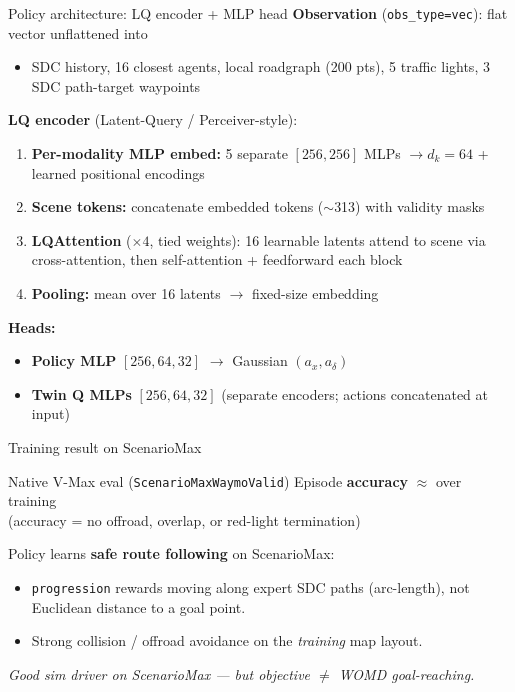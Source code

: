 \begin{frame}{Policy architecture: LQ encoder + MLP head}
  \textbf{Observation} (\texttt{obs\_type=vec}): flat vector unflattened into
  \begin{itemize}
    \item SDC history, 16 closest agents, local roadgraph (200 pts),
          5 traffic lights, 3 SDC path-target waypoints
  \end{itemize}

  \vspace{0.4em}
  \textbf{LQ encoder} (Latent-Query / Perceiver-style):
  \begin{enumerate}
    \item \textbf{Per-modality MLP embed:} 5 separate $[256,256]$ MLPs $\rightarrow d_k{=}64$ + learned positional encodings
    \item \textbf{Scene tokens:} concatenate embedded tokens ($\sim$313) with validity masks
    \item \textbf{LQAttention} ($\times 4$, tied weights): 16 learnable latents attend to scene via cross-attention, then self-attention + feedforward each block
    \item \textbf{Pooling:} mean over 16 latents $\rightarrow$ fixed-size embedding
  \end{enumerate}

  \vspace{0.4em}
  \textbf{Heads:}
  \begin{itemize}
    \item \textbf{Policy MLP} $[256,64,32]$ $\rightarrow$ Gaussian $(a_x, a_\delta)$
    \item \textbf{Twin Q MLPs} $[256,64,32]$ (separate encoders; actions concatenated at input)
  \end{itemize}
\end{frame}

\begin{frame}{Training result on ScenarioMax}
  \begin{block}{Native V-Max eval (\texttt{ScenarioMaxWaymoValid})}
    Episode \textbf{accuracy} $\approx$ \trainacc{} over training\\
    \small(accuracy = no offroad, overlap, or red-light termination)
  \end{block}

  \vspace{0.5em}
  Policy learns \textbf{safe route following} on ScenarioMax:
  \begin{itemize}
    \item \texttt{progression} rewards moving along expert SDC paths (arc-length), not Euclidean distance to a goal point.
    \item Strong collision / offroad avoidance on the \emph{training} map layout.
  \end{itemize}

  \vspace{0.3em}
  \centering
  \textit{Good sim driver on ScenarioMax --- but objective $\neq$ WOMD goal-reaching.}
\end{frame}

